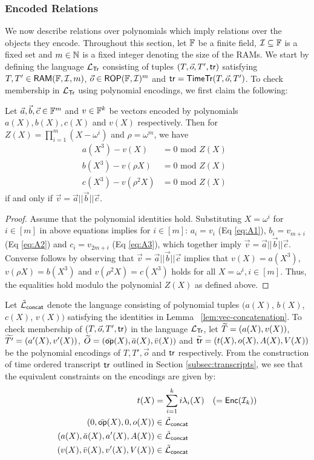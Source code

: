\subsubsection{Encoded Relations}\label{subsec:encoded-relations}
We now describe relations over polynomials which imply relations over the objects they encode. Throughout this section, let $\mathbb{F}$ be a finite
field, $\mathcal{I}\subseteq \mathbb{F}$ is a fixed set and $m\in \mathbb{N}$ is a fixed integer denoting the size of the RAMs. We start by defining the language
$\mathcal{L}_{\mathsf{Tr}}$ consisting of tuples $(T,\vec{o},T',\mathsf{tr})$ satisfying $T,T'\in \mathsf{RAM}(\mathbb{F}, \mathcal{I}, {m})$, $\vec{o}\in \mathsf{ROP}(\mathbb{F}, \mathcal{I})^m$ and $\mathsf{tr}=\mathsf{TimeTr}(T,\vec{o},T')$.
To check membership in $\mathcal{L}_{\mathsf{Tr}}$ using polynomial encodings, we first claim the following:
\begin{lemma}\label{lem:vec-concatenation}
    Let $\vec{a},\vec{b},\vec{c}\in \mathbb{F}^m$  and $v\in \mathbb{F}^k$ be vectors encoded by polynomials
    $a(X),b(X),c(X)$ and $v(X)$ respectively. Then for $Z(X)=\prod_{i=1}^m (X-\omega^i)$ and $\rho=\omega^m$, we have
    \begin{align}
        a(X^3) - v(X) &= 0  \text{ mod $Z(X)$ } \tag{A1}\label{eq:A1}\\
        b(X^3) - v(\rho X) &= 0 \text{ mod $Z(X)$ } \tag{A2}\label{eq:A2}\\
        c(X^3) - v(\rho^2 X) &= 0 \text{ mod $Z(X)$ } \tag{A3}\label{eq:A3}
    \end{align}
    if and only if $\vec{v}=\vec{a}||\vec{b}||\vec{c}$.
\end{lemma}
\begin{proof}
    Assume that the polynomial identities hold. Substituting $X=\omega^i$ for $i\in [m]$ in above equations implies
    for $i\in [m]$: $a_i=v_i$ (Eq \eqref{eq:A1}), $b_i=v_{m+i}$ (Eq \eqref{eq:A2}) and $c_i=v_{2m+i}$ (Eq \eqref{eq:A3}),
    which together imply $\vec{v}=\vec{a}||\vec{b}||\vec{c}$. Converse follows by observing that $\vec{v}=\vec{a}||\vec{b}||\vec{c}$
    implies that $v(X) = a(X^3)$, $v(\rho X)=b(X^3)$ and $v(\rho^2 X)=c(X^3)$ holds for all $X=\omega^i, i\in [m]$.
    Thus, the equalities hold modulo the polynomial $Z(X)$ as defined above.
\end{proof}

Let $\tilde{\mathcal{L}}_{\mathsf{concat}}$ denote the language consisting of polynomial tuples $(a(X)$, $b(X)$, $c(X)$, $v(X))$ satisfying the identities
in Lemma ~\ref{lem:vec-concatenation}. To check membership of $(T,\vec{o},T',\mathsf{tr})$ in the language $\mathcal{L}_{\mathsf{Tr}}$, let $\widetilde{T}=(a(X),v(X))$, $\widetilde{T'}=(a'(X),v'(X))$,
$\widetilde{O}=(\bar{\mathsf{op}}(X),\bar{a}(X),\bar{v}(X))$ and $\widetilde{\mathsf{tr}}=(t(X),o(X),A(X),V(X))$ be the polynomial
encodings of $T,T',\vec{o}$ and $\mathsf{tr}$ respectively.
From the construction of time ordered transcript $\mathsf{tr}$ outlined
in Section \ref{subsec:transcripts}, we see that the equivalent constraints on the encodings are given by:
\begin{align*}\label{eq:tot-poly-constraints}
t(X) &= \sum_{i=1}^k i\lambda_i(X) \quad (= \mathsf{Enc}(\mathcal{I}_k)) \\
(0, \bar{\mathsf{op}}(X), 0, o(X)) &\in \tilde{\mathcal{L}}_{\mathsf{concat}} \\
(a(X), \bar{a}(X), a'(X), A(X)) &\in \tilde{\mathcal{L}}_{\mathsf{concat}} \\
(v(X), \bar{v}(X), v'(X), V(X)) &\in \tilde{\mathcal{L}}_{\mathsf{concat}}
\end{align*}

